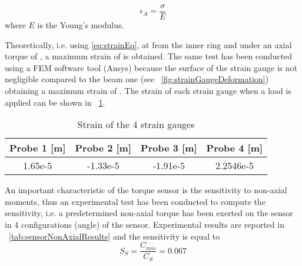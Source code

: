 \begin{equation}
\label{eq:strainEq}
\epsilon_A= \frac{\sigma}{E}
\end{equation} 
where $E$ is the Young's modulus.
\par Theoretically, i.e. using \eqref{eq:strainEq}, at \DIFdelbegin {}\DIFdelend \DIFaddbegin {}\DIFaddend from the inner ring and under an axial torque of \DIFdelbegin {}\DIFdelend \DIFaddbegin {}\DIFaddend ,  a maximum strain of \DIFdelbegin {}\DIFdelend \DIFaddbegin {}\DIFaddend is obtained.
The same test has been conducted using a FEM software tool (Ansys\textregistered) because the surface of the strain gauge is not negligible compared to the beam one (see \figurename \ \ref{fig:strainGaugeDeformation}) obtaining a maximum strain of \DIFdelbegin {}\DIFdelend \DIFaddbegin {}\DIFaddend .
The strain of each strain gauge when a \DIFdelbegin {}\DIFdelend \DIFaddbegin {}\DIFaddend load is applied can be shown in \tablename \ \ref{tab:sensorStrain}.
\begin{table}[]
	\renewcommand{\arraystretch}{1.3}
	\caption{Strain of the 4 strain gauges}
	\label{tab:sensorStrain}
	\centering
	\begin{tabular}{c c c c}
		\hline \hline
		\bfseries Probe 1 [m] & \bfseries Probe 2 [m] & \bfseries Probe 3 [m] & \bfseries Probe 4 [m]\\
		\hline
		1.65e-5  & -1.33e-5 & -1.91e-5 & 2.2546e-5\\
		\hline \hline
	\end{tabular}
\end{table} 
%
\par An important characteristic of the torque sensor is the sensitivity to non-axial moments, thus an experimental test has been conducted to compute the sensitivity, i.e. a predetermined non-axial torque has been exerted on the sensor in 4 configurations (angle) of the sensor.
Experimental results are reported in \tablename \ \ref{tab:sensorNonAxialResults} and the sensitivity is equal to
\begin{equation}
S_S=\frac{C_{mis}}{C_S}=0.067
\label{eq:sensitivityToNonAxLoad}
\end{equation} 
%
